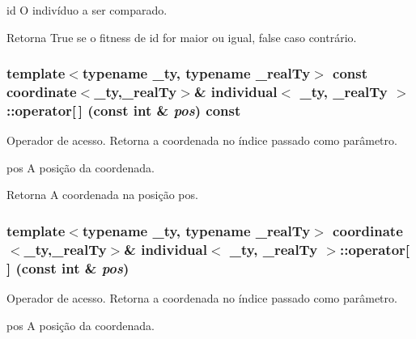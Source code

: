 id O indivíduo a ser comparado.

\begin{DoxyReturn}{Retorna}
True se o fitness de id for maior ou igual, false caso contrário. 
\end{DoxyReturn}
\hypertarget{classindividual_afe28d4eab4c2cc479b00931cc5c51d1b}{
\subsubsection[{operator[]}]{\setlength{\rightskip}{0pt plus 5cm}template$<$typename \_\-ty, typename \_\-realTy$>$ const {\bf coordinate}$<$\_\-ty,\_\-realTy$>$\& {\bf individual}$<$ \_\-ty, \_\-realTy $>$::operator\mbox{[}$\,$\mbox{]} (const int \& {\em pos}) const}}
\label{classindividual_afe28d4eab4c2cc479b00931cc5c51d1b}
Operador de acesso. Retorna a coordenada no índice passado como parâmetro.

pos A posição da coordenada.

\begin{DoxyReturn}{Retorna}
A coordenada na posição pos. 
\end{DoxyReturn}
\hypertarget{classindividual_a62c3d8ac9655e7cc94bd290013a7fb9c}{
\subsubsection[{operator[]}]{\setlength{\rightskip}{0pt plus 5cm}template$<$typename \_\-ty, typename \_\-realTy$>$ {\bf coordinate}$<$\_\-ty,\_\-realTy$>$\& {\bf individual}$<$ \_\-ty, \_\-realTy $>$::operator\mbox{[}$\,$\mbox{]} (const int \& {\em pos})}}
\label{classindividual_a62c3d8ac9655e7cc94bd290013a7fb9c}
Operador de acesso. Retorna a coordenada no índice passado como parâmetro.

pos A posição da coordenada.

